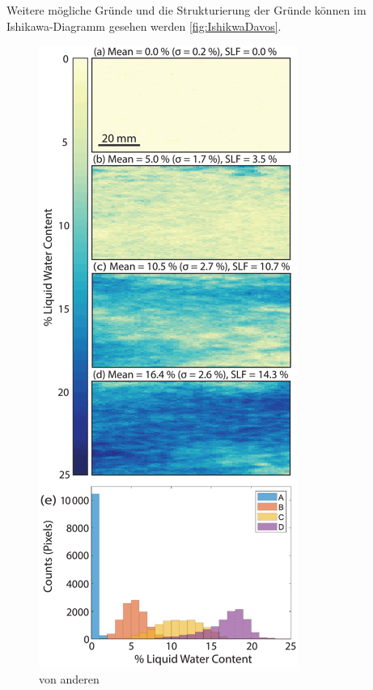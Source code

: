 Weitere mögliche Gründe und die Strukturierung der Gründe können im Ishikawa-Diagramm gesehen werden \ref{fig:IshikwaDavos}.



\begin{figure}
    \centering
    \includegraphics[width=0.8\textheight]{Bilder/tc-16-43-2022-f08-thumb.png}
    \caption{von anderen}
    \label{fig:IRPaper}
\end{figure}

